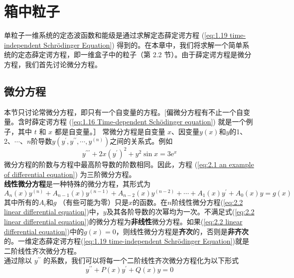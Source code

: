 \chapter{箱中粒子}
\label{chap:2}
	单粒子一维系统的定态波函数和能级是通过求解定态薛定谔方程 (\ref{eq:1.19 time-independent Schrödinger Equation}) 得到的。在本章中，我们将求解一个简单系统的定态薛定谔方程，即一维盒子中的粒子（第 2.2 节）。由于薛定谔方程是微分方程，我们首先讨论微分方程。
\section{微分方程}
\label{sec:2.1 Differential Equations}
	本节只讨论常微分方程，即只有一个自变量的方程。[偏微分方程有不止一个自变量。含时薛定谔方程 (\ref{eq:1.16 Time-dependent Schödinger equation}) 就是一个例子，其中 $t$ 和 $x$ 都是自变量。］ 
	常微分方程是自变量 $x$、因变量$y\left(x\right)$和$y$的1、2、$\cdots$、$n$阶导数$y\left(y^{\prime},y^{\prime\prime}, \cdots, y^{\left(n\right)}\right)$之间的关系式。例如
	\begin{equation}
		y^{\prime\prime\prime}+2x\left(y^{\prime}\right)^2+y^2\sin x = 3\mathrm{e}^x
		\label{eq:2.1 an example of differential equation}
	\end{equation}
	微分方程的阶数与方程中最高阶导数的阶数相同。因此，方程 (\ref{eq:2.1 an example of differential equation}) 为三阶微分方程。\\
	\indent \textbf{线性微分方程}是一种特殊的微分方程，其形式为
	\begin{equation}
		A_n\left(x\right)y^{\left(n\right)}+A_{n-1}\left(x\right)y^{\left(n-1\right)}+A_{n-2}\left(x\right)y^{\left(n-2\right)}+\cdots+A_1\left(x\right)y^{\prime}+A_0\left(x\right)y=g\left(x\right)
		\label{eq:2.2 linear differential equation}
	\end{equation}
	其中所有的$A_i$和$g$ （有些可能为零）只是$x$的函数。在$n$阶线性微分方程(\ref{eq:2.2 linear differential equation})中，$y$及其各阶导数的次幂均为一次。不满足式(\ref{eq:2.2 linear differential equation})的微分方程为\textbf{非线性}微分方程。如果(\ref{eq:2.2 linear differential equation})中的$g\left(x\right)=0$，则线性微分方程是\textbf{齐次}的，否则是\textbf{非齐次}的。一维定态薛定谔方程(\ref{eq:1.19 time-independent Schrödinger Equation})就是二阶线性齐次微分方程。\\
	\indent 通过除以 $y^{\prime \prime}$ 的系数，我们可以将每一个二阶线性齐次微分方程化为以下形式
	\begin{equation}
		y^{\prime\prime}+P\left(x\right)y^{\prime}+Q\left(x\right)y=0
		\label{eq:2.3 linear homogeneous differential equation}
	\end{equation}

